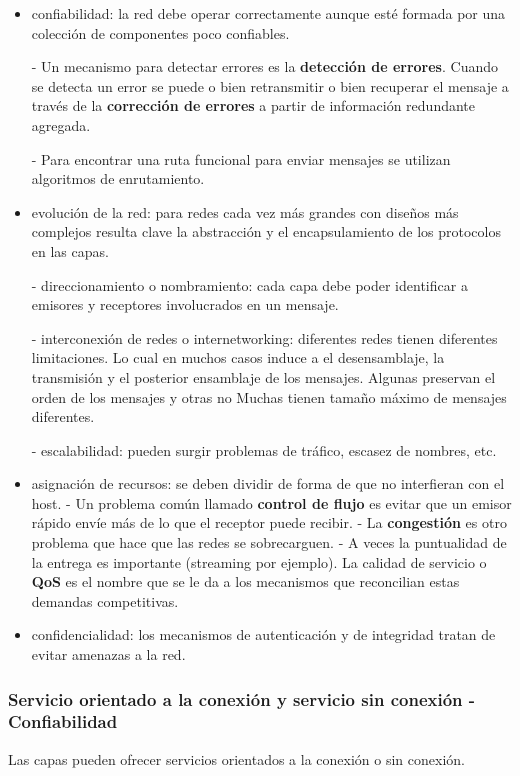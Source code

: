 \documentclass{book}
\begin{document}
	\begin{itemize}
		\item confiabilidad: la red debe operar correctamente aunque esté formada por una colección de componentes poco confiables.
		
		\subitem - Un mecanismo para detectar errores es la \textbf{detección de errores}. Cuando se detecta un error se puede o bien retransmitir o bien recuperar el mensaje a través de la \textbf{corrección de errores} a partir de información redundante agregada.
		
		\subitem - Para encontrar una ruta funcional para enviar mensajes se utilizan algoritmos de enrutamiento.
		
		\item evolución de la red: para redes cada vez más grandes con diseños más complejos resulta clave la abstracción y el encapsulamiento de los protocolos en las capas.
		
		\subitem - direccionamiento o nombramiento: cada capa debe poder identificar a emisores y receptores involucrados en un mensaje.
		
		\subitem - interconexión de redes o internetworking: diferentes redes tienen diferentes limitaciones. Lo cual en muchos casos induce a el desensamblaje, la transmisión y el posterior ensamblaje de los mensajes.
		\subsubitem * Algunas preservan el orden de los mensajes y otras no
		\subsubitem * Muchas tienen tamaño máximo de mensajes diferentes.
		
		\subitem - escalabilidad: pueden surgir problemas de tráfico, escasez de nombres, etc.
		\item asignación de recursos: se deben dividir de forma de que no interfieran con el host. 
		\subitem - Un problema común llamado \textbf{control de flujo} es evitar que un emisor rápido envíe más de lo que el receptor puede recibir. 
		\subitem - La \textbf{congestión} es otro problema que hace que las redes se sobrecarguen.
		\subitem - A veces la puntualidad de la entrega es importante (streaming por ejemplo). La calidad de servicio o \textbf{QoS} es el nombre que se le da a los mecanismos que reconcilian estas demandas competitivas.
		
		\item confidencialidad: los mecanismos de autenticación y de integridad tratan de evitar amenazas a la red.
	\end{itemize}
	
	\subsubsection{Servicio orientado a la conexión y servicio sin conexión - Confiabilidad}
	Las capas pueden ofrecer servicios orientados a la conexión o sin conexión.
	
\end{document}

